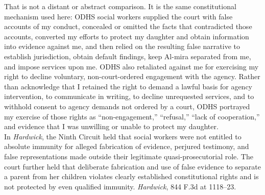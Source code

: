 \documentclass[10pt,a4paper,roman]{moderncv}
\begin{document}
	\noindent That is not a distant or abstract comparison. It is the same constitutional mechanism used here: ODHS social workers supplied the court with false accounts of my conduct, concealed or omitted the facts that contradicted those accounts, converted my efforts to protect my daughter and obtain information into evidence against me, and then relied on the resulting false narrative to establish jurisdiction, obtain default findings, keep Al-mira separated from me, and impose services upon me. ODHS also retaliated against me for exercising my right to decline voluntary, non-court-ordered engagement with the agency. Rather than acknowledge that I retained the right to demand a lawful basis for agency intervention, to communicate in writing, to decline unrequested services, and to withhold consent to agency demands not ordered by a court, ODHS portrayed my exercise of those rights as ``non-engagement,'' ``refusal,'' ``lack of cooperation,'' and evidence that I was unwilling or unable to protect my daughter.\\
	
	\noindent In \emph{Hardwick}, the Ninth Circuit held that social workers were not entitled to absolute immunity for alleged fabrication of evidence, perjured testimony, and false representations made outside their legitimate quasi-prosecutorial role. The court further held that deliberate fabrication and use of false evidence to separate a parent from her children violates clearly established constitutional rights and is not protected by even qualified immunity. \emph{Hardwick}, 844 F.3d at 1118--23.\\
	
\end{document}
